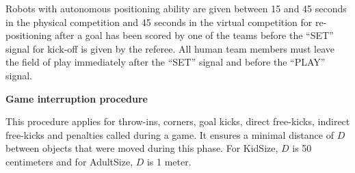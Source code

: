 \bigskip

Robots with autonomous positioning ability are given between 15 and 45 seconds in the physical competition and 45 seconds in the virtual competition
for re-positioning after a goal has been scored by one of the teams before the
``SET'' signal for kick-off is given by the referee. 
All human team members must leave the field of play immediately after the
``SET'' signal and before the ``PLAY'' signal.

\bigskip


{\bfseries Game interruption procedure}

This procedure applies for throw-ins, corners, goal kicks, direct free-kicks,
indirect free-kicks and penalties called during a game.
It ensures a minimal distance of $D$ between objects that were moved during
this phase.
For KidSize, $D$ is 50 centimeters and for AdultSize, $D$ is 1 meter.

